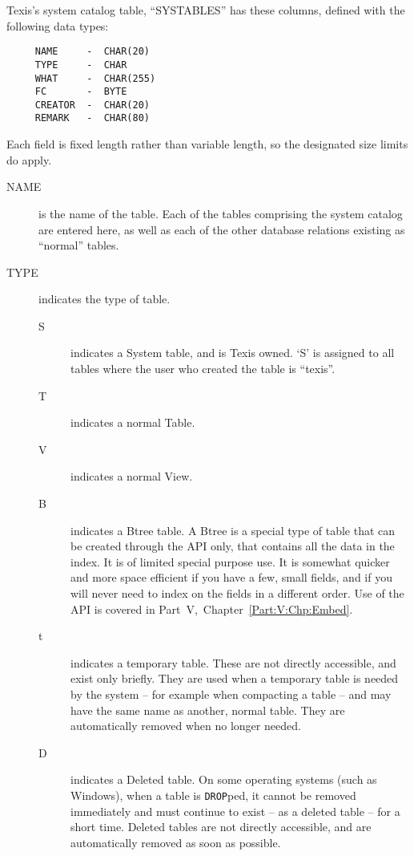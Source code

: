 Texis's system catalog table, ``SYSTABLES'' has these columns, defined
with the following data types:

\begin{verbatim}
     NAME     -  CHAR(20)
     TYPE     -  CHAR
     WHAT     -  CHAR(255)
     FC       -  BYTE
     CREATOR  -  CHAR(20)
     REMARK   -  CHAR(80)
\end{verbatim}

Each field is fixed length rather than variable length, so the
designated size limits do apply.

\begin{description}
\item[NAME] is the name of the table.  Each of the tables comprising
the system catalog are entered here, as well as each of the other
database relations existing as ``normal'' tables.

\item[TYPE] indicates the type of table.
\begin{description}
\item[S] indicates a System table, and is Texis owned.  `S' is
assigned to all tables where the user who created the table is
``texis''.
\item[T] indicates a normal Table.
\item[V] indicates a normal View.

\item[B] indicates a Btree table.  A Btree is a special type of table
that can be created through the API only, that contains all the data
in the index.  It is of limited special purpose use.  It is somewhat
quicker and more space efficient if you have a few, small fields, and
if you will never need to index on the fields in a different order.
Use of the API is covered in Part~V,~Chapter~\ref{Part:V:Chp:Embed}.

\item[t] indicates a temporary table.  These are not directly
accessible, and exist only briefly.  They are used when a temporary
table is needed by the system -- for example when compacting a table
-- and may have the same name as another, normal table.  They are
automatically removed when no longer needed.

\item[D] indicates a Deleted table.  On some operating systems (such
as Windows), when a table is \verb`DROP`ped, it cannot be removed
immediately and must continue to exist -- as a deleted table -- for a
short time.  Deleted tables are not directly accessible, and are
automatically removed as soon as possible.


\end{description}
\end{description}
